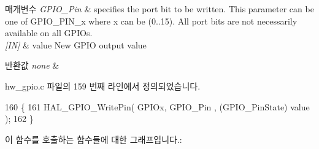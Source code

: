 \begin{DoxyParams}{매개변수}
{\em G\+P\+I\+O\+\_\+\+Pin} & specifies the port bit to be written. This parameter can be one of G\+P\+I\+O\+\_\+\+P\+I\+N\+\_\+x where x can be (0..15). All port bits are not necessarily available on all G\+P\+I\+Os. \\
\hline
{\em \mbox{[}\+I\+N\mbox{]}} & value New G\+P\+IO output value \\
\hline
\end{DoxyParams}

\begin{DoxyRetVals}{반환값}
{\em none} & \\
\hline
\end{DoxyRetVals}


hw\+\_\+gpio.\+c 파일의 159 번째 라인에서 정의되었습니다.


\begin{DoxyCode}
160 \{
161   HAL\_GPIO\_WritePin( GPIOx, GPIO\_Pin , (GPIO\_PinState) value );
162 \}
\end{DoxyCode}
이 함수를 호출하는 함수들에 대한 그래프입니다.\+:
